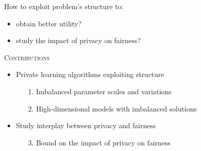 \documentclass[17pt,aspectratio=169]{beamer}
\begin{document}
\begin{frame}
  \large

  \vspace{1em}

  How to exploit problem's structure to:

  \begin{center}
    \begin{itemize}
      \setlength{\itemsep}{0.5em}
    \item obtain better utility?
    \item study the impact of privacy on fairness?
    \end{itemize}

  \end{center}
\end{frame}

\begin{frame}{\textsc{Contributions}}
  \pause

  \begin{itemize}
    \large
  \item Private learning algorithms exploiting structure
    \begin{enumerate}
      \normalsize
    \item[1.] Imbalanced parameter scales and variations
    \item[2.] High-dimensional models with imbalanced solutions
    \end{enumerate}
    \vspace{1em}
    \pause
  \item Study interplay between privacy and fairness
    \large
    \begin{enumerate}
      \normalsize
    \item[3.] Bound on the impact of privacy on fairness
    \end{enumerate}
  \end{itemize}
\end{frame}
\end{document}
